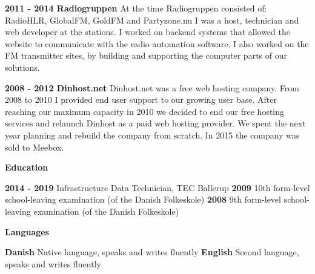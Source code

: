 \documentclass[11pt]{article}
\begin{document}
\textbf{2011 - 2014   Radiogruppen}\newline
At the time Radiogruppen consisted of: RadioHLR, GlobalFM, GoldFM and Partyzone.nu I was a host, technician and
web developer at the stations. I worked on backend systems that allowed the website to communicate with the
radio automation software. I also worked on the FM transmitter sites, by building and supporting the computer
parts of our solutions.\newline

\textbf{2008 - 2012   Dinhost.net}\newline
Dinhost.net was a free web hosting company. From 2008 to 2010 I provided end user support to our growing user
base. After reaching our maximum capacity in 2010 we decided to end our free hosting services and relaunch
Dinhost as a paid web hosting provider. We spent the next year planning and rebuild the company from scratch. In
2015 the company was sold to Meebox.\newline

\textcolor{mygreen}{{\fontsize{13}{16}\textbf{{Education}}}}\newline

\textbf{2014 - 2019}   Infrastructure Data Technician, TEC Ballerup\newline
\textbf{2009}          10th form-level school-leaving examination (of the Danish Folkeskole)\newline
\textbf{2008}          9th form-level school-leaving examination (of the Danish Folkeskole)\newline

\textcolor{mygreen}{{\fontsize{13}{16}\textbf{{Languages}}}}\newline

\textbf{Danish}        Native language, speaks and writes fluently\newline
\textbf{English}       Second language, speaks and writes fluently\newline
\end{document}

